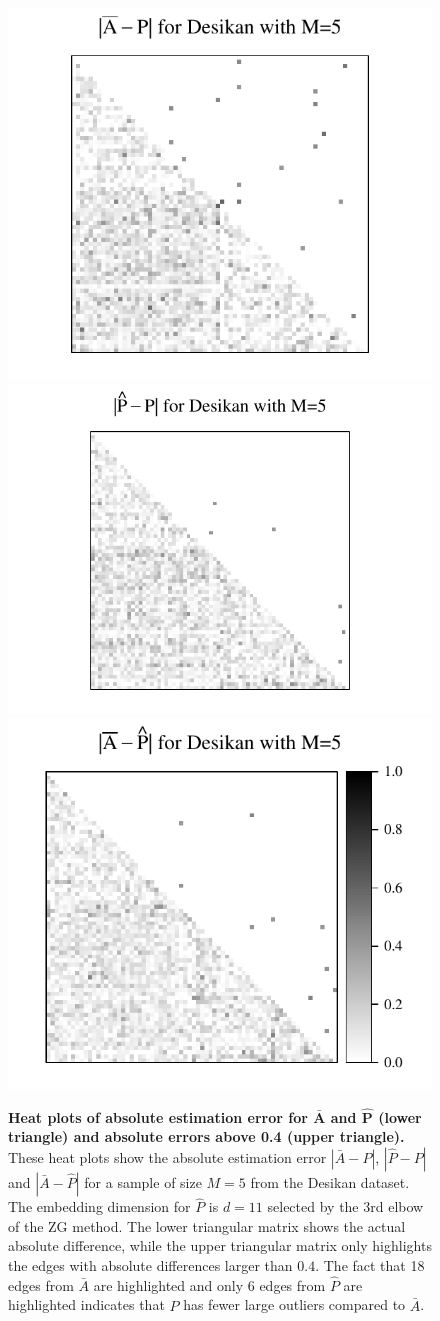 \documentclass[10pt,letterpaper]{article}
\renewcommand{\hat}{\widehat}
\begin{document}
\begin{figure}
\begin{center}
  \includegraphics[height=.325\linewidth]{Diff2_desikan_m5.pdf}\hspace{-40pt}
  \includegraphics[height=.33\linewidth]{Diff3_desikan_m5.pdf}\hspace{-32pt}
  \includegraphics[height=.33\linewidth]{Diff1_desikan_m5.pdf}
\end{center}
\caption{{\bf Heat plots of absolute estimation error for $\bm{\bar{A}}$ and $\bm{\hat{P}}$ (lower triangle) and absolute errors above 0.4 (upper triangle).}
These heat plots show the absolute estimation error $|\bar{A} - P|$, $|\hat{P} - P|$ and $|\bar{A} - \hat{P}|$ for a sample of size $M=5$ from the Desikan dataset.
The embedding dimension for $\hat{P}$ is $d=11$ selected by the 3rd elbow of the ZG method. The lower triangular matrix shows the actual absolute difference, while the upper triangular matrix only highlights the edges with absolute differences larger than $0.4$. The fact that 18 edges from $\bar{A}$ are highlighted and only 6 edges from $\hat{P}$ are highlighted indicates that $\hat{P}$ has fewer large outliers compared to $\bar{A}$.
}
\label{fig:Diff_desikan_m5}
\end{figure}
\end{document}
